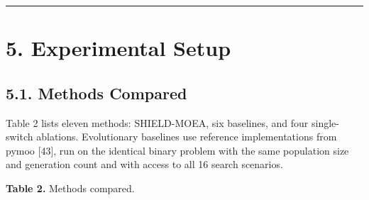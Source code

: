 \documentclass[
  10pt,
  a4paper,
]{article}
\begin{document}
\begin{center}\rule{0.5\linewidth}{0.5pt}\end{center}

\section{5. Experimental Setup}\label{experimental-setup}

\subsection{5.1. Methods Compared}\label{methods-compared}

Table 2 lists eleven methods: SHIELD-MOEA, six baselines, and four
single-switch ablations. Evolutionary baselines use reference
implementations from pymoo {[}43{]}, run on the identical binary problem
with the same population size and generation count and with access to
all 16 search scenarios.

\textbf{Table 2.} Methods compared.
\end{document}
